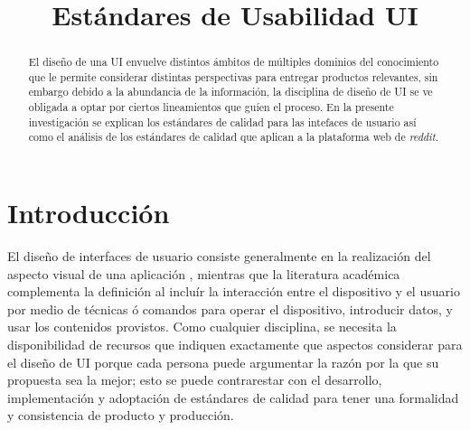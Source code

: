 \title{Estándares de Usabilidad UI}

\author{
}

\maketitle

\begin{abstract}
El diseño de una UI envuelve distintos ámbitos de múltiples dominios del conocimiento
que le permite considerar distintas perspectivas para entregar productos relevantes, sin embargo
debido a la abundancia de la información, la disciplina de diseño de UI se ve obligada a optar
por ciertos lineamientos que guíen el proceso. En la presente investigación se explican 
los estándares de calidad para las intefaces de usuario así como el análisis de los 
estándares de calidad que aplican a la plataforma web de \emph{reddit}.
\end{abstract}

\section{Introducción}
El diseño de interfaces de usuario consiste generalmente en la realización del aspecto
visual de una aplicación \cite{tutorialspoint-2021,geeksforgeeks-2022,unknown-author-no-dateA},
mientras que la literatura académica \cite{sharma-2021} complementa la definición
al incluír la interacción entre el dispositivo y el usuario por medio de técnicas 
ó comandos para operar el dispositivo, introducir datos, y usar los contenidos provistos.
Como cualquier disciplina, se necesita la disponibilidad de recursos que indiquen exactamente
que aspectos considerar para el diseño de UI porque cada persona puede argumentar la razón
por la que su propuesta sea la mejor; esto se puede contrarestar con el desarrollo, implementación
y adoptación de estándares de calidad para tener una formalidad y consistencia de producto y producción.

